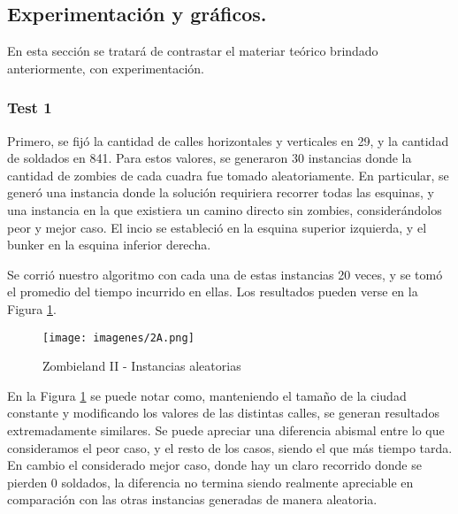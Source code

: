 \vspace*{0.6cm}

\subsection{Experimentación y gráficos.}

En esta sección se tratará de contrastar el materiar teórico brindado anteriormente, con experimentación. 

\subsubsection{Test 1}

\vspace*{0.3cm}

Primero, se fijó la cantidad de calles horizontales y verticales en 29, y la cantidad de soldados en 841.  Para estos valores, se generaron 30 instancias donde la cantidad de zombies de cada cuadra fue tomado aleatoriamente. En particular, se generó una instancia donde la solución requiriera recorrer todas las esquinas, y una instancia en la que existiera un camino directo sin zombies, considerándolos peor y mejor caso.  El incio se estableció en la esquina superior izquierda, y el bunker en la esquina inferior derecha.

Se corrió nuestro algoritmo con cada una de estas instancias 20 veces, y se tomó el promedio del tiempo incurrido en ellas.  Los resultados pueden verse en la Figura \ref{fig:2A}.

\begin{figure}[htb]
	\begin{center}
    		\texttt{[image: imagenes/2A.png]}
	\end{center}
	\caption{Zombieland II - Instancias aleatorias}\label{fig:2A}
\end{figure}



En la Figura \ref{fig:2A} se puede notar como, manteniendo el tamaño de la ciudad constante y modificando los valores de las distintas calles, se generan resultados extremadamente similares. Se puede apreciar una diferencia abismal entre lo que consideramos el peor caso, y el resto de los casos, siendo el que más tiempo tarda. En cambio el considerado mejor caso, donde hay un claro recorrido donde se pierden 0 soldados, la diferencia no termina siendo realmente apreciable en comparación con las otras instancias generadas de manera aleatoria.

